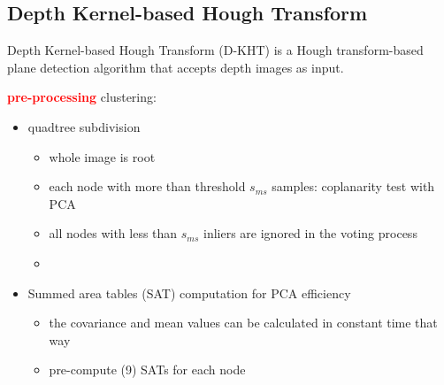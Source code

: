 \documentclass[main.tex]{subfiles}
\begin{document}
\subsection{Depth Kernel-based Hough Transform}
Depth Kernel-based Hough Transform (D-KHT) \cite{Vera_Lucio_Fernandes_Velho_2018} is a Hough transform-based plane detection
algorithm that accepts depth images as input.

\textbf{\textcolor{red}{pre-processing}}
clustering:
\begin{itemize}
    \item quadtree subdivision
    \begin{itemize}
        \item whole image is root
        \item each node with more than threshold $s_{ms}$ samples: coplanarity test with PCA
        \item all nodes with less than $s_{ms}$ inliers are ignored in the voting process
        \item 
    \end{itemize}
    \item Summed area tables (SAT) computation for PCA efficiency
    \begin{itemize}
        \item the covariance and mean values can be calculated in constant time that way
        \item pre-compute (9) SATs for each node 
    \end{itemize}
\end{itemize}
\end{document}
